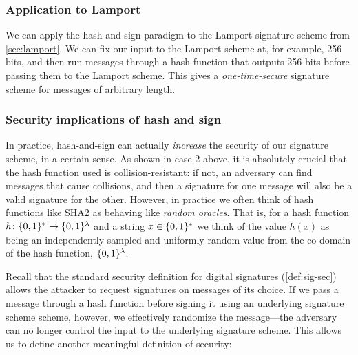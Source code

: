 \subsubsection{Application to Lamport}
We can apply the hash-and-sign paradigm to the Lamport signature scheme from \cref{sec:lamport}.
We can fix our input to the Lamport scheme at, for example, 256 bits, and then run messages through a hash function that outputs 256 bits before passing them to the Lamport scheme.
This gives a \emph{one-time-secure} signature scheme for messages of arbitrary length.

\subsubsection{Security implications of hash and sign}

In practice, hash-and-sign can actually \emph{increase} the security of our signature scheme, in a certain sense. As shown in case 2 above, it is absolutely crucial that the hash function used is collision-resistant: if not, an adversary can find messages that cause collisions, and then a signature for one message will also be a valid signature for the other. However, in practice we often think of hash functions like SHA2 as behaving like \emph{random oracles}.
That is, for a hash function $h \colon \{0,1\}^* \to \{0,1\}^\lambda$ and a string $x \in \{0,1\}^*$ we think of the value $h(x)$ as being an independently
sampled and uniformly random value from the co-domain of the hash function, $\{0,1\}^\lambda$.

Recall that the standard security definition for
digital signatures (\cref{def:sig-sec}) allows
the attacker to request signatures on messages
of its choice.
If we pass a message through a hash function before signing
it using an underlying signature scheme scheme, however, 
we effectively randomize the message---the adversary can no longer control the
input to the underlying signature scheme. This allows us to define
another meaningful definition of security:

